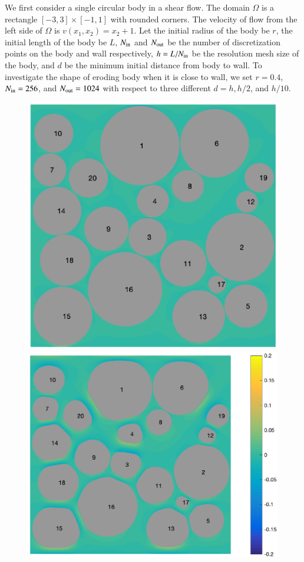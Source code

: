 \documentclass[preprint, 10pt]{elsarticle}
\begin{document}
{\color{red} We first consider a single circular body in a shear flow. The domain $\Omega$ is a rectangle $[-3,3]\times[-1,1]$ with rounded corners. The velocity of flow from the left side of $\Omega$ is $v(x_1,x_2)=x_2+1$. Let the initial radius of the body be $r$, the initial length of the body be $L$, $N_{\mathrm{in}}$ and $N_{\mathrm{out}}$ be the number of discretization points on the body and wall respectively, $h=L/N_{\mathrm{in}}$ be the resolution mesh size of the body, and $d$ be the minimum initial distance from body to wall. 
To investigate the shape of eroding body when it is close to wall, we set $r=0.4$, $N_{\mathrm{in}}=256$, and $N_{\mathrm{out}}=1024$ with respect to three different $d=h, h/2$, and $ h/10$. 

}

\begin{figure}[H]
\begin{center}
\includegraphics[width = 0.42 \textwidth]{./figs/20b_dense_1}
\includegraphics[width = 0.507 \textwidth]{./figs/20b_dense_101}\\


\end{center}
\end{figure}
\end{document}
